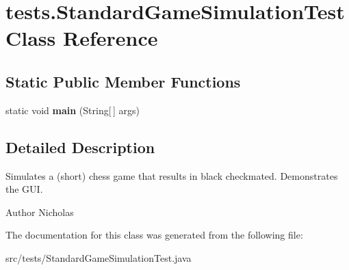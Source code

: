 \hypertarget{classtests_1_1_standard_game_simulation_test}{\section{tests.\-Standard\-Game\-Simulation\-Test Class Reference}
\label{classtests_1_1_standard_game_simulation_test}
}
\subsection*{Static Public Member Functions}
\begin{DoxyCompactItemize}
\item 
\hypertarget{classtests_1_1_standard_game_simulation_test_ac9b95ee7d33b13900839daf5ade8657e}{static void {\bfseries main} (String\mbox{[}$\,$\mbox{]} args)}\label{classtests_1_1_standard_game_simulation_test_ac9b95ee7d33b13900839daf5ade8657e}

\end{DoxyCompactItemize}


\subsection{Detailed Description}
Simulates a (short) chess game that results in black checkmated. Demonstrates the G\-U\-I.

\begin{DoxyAuthor}{Author}
Nicholas 
\end{DoxyAuthor}


The documentation for this class was generated from the following file\-:\begin{DoxyCompactItemize}
\item 
src/tests/Standard\-Game\-Simulation\-Test.\-java\end{DoxyCompactItemize}
